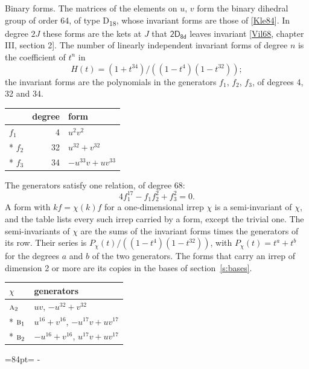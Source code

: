 \documentclass[10pt,a4paper]{article}
\makeatletter
\renewcommand\paragraph{\@startsection{paragraph}{4}{\z@}{1.5ex plus .5ex minus .2ex}{-1em}%
  {\normalfont\small\sffamily\bfseries\color{parttitle}}}
\newcommand{\needspace}[1]{\par\penalty-100\begingroup\dimen0=#1\relax\dimen2=\pagegoal
  \advance\dimen2-\pagetotal\ifdim\dimen0>\dimen2\relax\ifdim\dimen2>0pt\vfil\break\fi\fi
  \endgroup}
\numberwithin{equation}{section}
\newcommand{\grp}[1]{\mathsf{#1}}
\newcommand{\irr}[1]{\text{\normalfont\scshape #1}}
\makeatother
\begin{document}
\paragraph{Binary forms.}
The matrices of the elements on $u$, $v$ form the binary dihedral group of order 64, of type D\textsubscript{18}, whose invariant forms are those of [\href{../../../REFERENCES.pdf\#ref.Kle84}{Kle84}]. In degree $2J$ these forms are the kets at $J$ that $\grp{2D_{8d}}$ leaves invariant [\href{../../../REFERENCES.pdf\#ref.Vil68}{Vil68}, chapter III, section 2]. \label{n:head.degree}\label{n:head.form}The number of linearly independent invariant forms of degree $n$ is the coefficient of $t^n$ in
\begin{equation}\label{e:molien}H(t) = (1 + t^{34})/((1-t^{4})(1-t^{32}));\end{equation}
the invariant forms are the polynomials in the generators $f_1$, $f_2$, $f_3$, of degrees 4, 32 and 34.
{\small\begin{longtable}{@{}lrl@{}}\toprule
& degree & form\\\midrule\endhead
\bottomrule\endfoot\endlastfoot
$f_{1}$ & 4 & $u^{2}v^{2}$\\*
$f_{2}$ & 32 & $u^{32} + v^{32}$\\*
$f_{3}$ & 34 & $-u^{33}v + uv^{33}$\\
\bottomrule\end{longtable}}
The generators satisfy one relation, of degree 68:
\begin{equation}\label{e:relation}4f_{1}^{17} - f_{1}f_{2}^{2} + f_{3}^{2} = 0.\end{equation}
A form with $k f = \chi(k) f$ for a one-dimensional irrep $\chi$ is a semi-invariant of $\chi$, and the table lists every such irrep carried by a form, except the trivial one. \label{n:head.generators}The semi-invariants of $\chi$ are the sums of the invariant forms times the generators of its row. Their series is $P_\chi(t)/((1-t^{4})(1-t^{32}))$, with $P_\chi(t) = t^{a} + t^{b}$ for the degrees $a$ and $b$ of the two generators. The forms that carry an irrep of dimension 2 or more are its copies in the bases of section~\ref{s:bases}.
{\small\begin{longtable}{@{}ll@{}}\toprule
$\chi$ & generators\\\midrule\endhead
\bottomrule\endfoot\endlastfoot
$\irr{a}_{2}$ & $uv$, $-u^{32} + v^{32}$\\*
$\irr{b}_{1}$ & $u^{16} + v^{16}$, $-u^{17}v + uv^{17}$\\*
$\irr{b}_{2}$ & $-u^{16} + v^{16}$, $u^{17}v + uv^{17}$\\
\bottomrule\end{longtable}}
\needspace{84pt}
\end{document}
